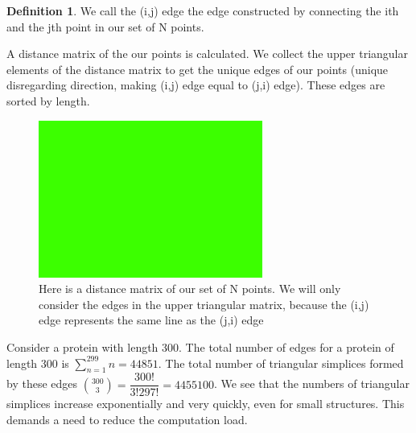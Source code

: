 \documentclass[12pt, a4paper, twocolumn, fullpage]{article}
\theoremstyle{plain}
\theoremstyle{definition}
\newtheorem{defn}{Definition}[section]
\theoremstyle{remark}
\begin{document}
\begin{defn}
We call the (i,j) edge the edge constructed by connecting the ith and the jth point in our set of N points.
\end{defn}

A distance matrix of the our points is calculated. We collect the upper triangular elements of the distance matrix to get the unique edges of our points (unique disregarding direction, making (i,j) edge equal to (j,i) edge). These edges are sorted by length.

\begin{figure}[t]
    \includegraphics[width=\linewidth]{img/blank.png}
    \caption{Here is a distance matrix of our set of N points. We will only consider the edges in the upper triangular matrix, because the (i,j) edge represents the same line as the (j,i) edge}
    \label{Distance matrix of example}
\end{figure}

Consider a protein with length 300. The total number of edges for a protein of length 300 is $\sum_{n=1}^{299} n =44851$. The total number of triangular simplices formed by these edges $\binom{300}{3}=\dfrac{300!}{3!297!}=4455100$.  We see that the numbers of triangular simplices increase exponentially and very quickly, even for small structures. This demands a need to reduce the computation load.
\end{document}
